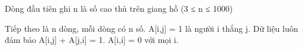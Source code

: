 Dòng đầu tiên ghi n là số cao thủ trên giang hồ (3 ≤ n ≤ 1000)  

   Tiếp theo là n dòng, mỗi dòng có n số. A[i,j] = 1 là người i thắng j. Dữ liệu luôn đảm bảo A[i,j] + A[j,i] = 1. A[i,i] = 0 với mọi i.  

\